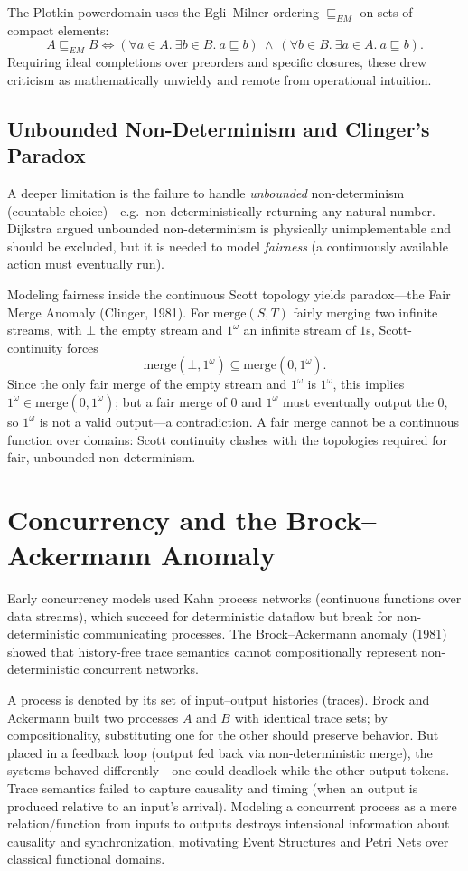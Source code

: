 \documentclass[11pt]{article}
\begin{document}
The Plotkin powerdomain uses the Egli--Milner ordering $\sqsubseteq_{EM}$ on sets of compact
elements:
\[
  A \sqsubseteq_{EM} B \iff
  (\forall a \in A.\ \exists b \in B.\ a \sqsubseteq b)\ \wedge\
  (\forall b \in B.\ \exists a \in A.\ a \sqsubseteq b).
\]
Requiring ideal completions over preorders and specific closures, these drew criticism as
mathematically unwieldy and remote from operational intuition.

\subsection{Unbounded Non-Determinism and Clinger's Paradox}

A deeper limitation is the failure to handle \emph{unbounded} non-determinism (countable
choice)---e.g.\ non-deterministically returning any natural number. Dijkstra argued
unbounded non-determinism is physically unimplementable and should be excluded, but it is
needed to model \emph{fairness} (a continuously available action must eventually run).

Modeling fairness inside the continuous Scott topology yields paradox---the Fair Merge
Anomaly (Clinger, 1981). For $\mathrm{merge}(S,T)$ fairly merging two infinite streams, with
$\bot$ the empty stream and $1^\omega$ an infinite stream of $1$s, Scott-continuity forces
\[
  \mathrm{merge}(\bot, 1^\omega) \subseteq \mathrm{merge}(0, 1^\omega).
\]
Since the only fair merge of the empty stream and $1^\omega$ is $1^\omega$, this implies
$1^\omega \in \mathrm{merge}(0, 1^\omega)$; but a fair merge of $0$ and $1^\omega$ must
eventually output the $0$, so $1^\omega$ is not a valid output---a contradiction. A fair
merge cannot be a continuous function over domains: Scott continuity clashes with the
topologies required for fair, unbounded non-determinism.

\section{Concurrency and the Brock--Ackermann Anomaly}

Early concurrency models used Kahn process networks (continuous functions over data
streams), which succeed for deterministic dataflow but break for non-deterministic
communicating processes. The Brock--Ackermann anomaly (1981) showed that history-free
trace semantics cannot compositionally represent non-deterministic concurrent networks.

A process is denoted by its set of input--output histories (traces). Brock and Ackermann
built two processes $A$ and $B$ with identical trace sets; by compositionality, substituting
one for the other should preserve behavior. But placed in a feedback loop (output fed back
via non-deterministic merge), the systems behaved differently---one could deadlock while the
other output tokens. Trace semantics failed to capture causality and timing (when an output
is produced relative to an input's arrival). Modeling a concurrent process as a mere
relation/function from inputs to outputs destroys intensional information about causality and
synchronization, motivating Event Structures and Petri Nets over classical functional domains.
\end{document}
